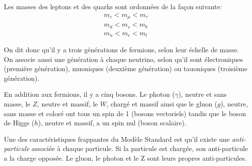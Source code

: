 Les masses des
leptons et des quarks sont ordonnées de la façon suivante:
\begin{eqnarray}
  m_e < m_\mu < m_\tau \nonumber \\
  m_d < m_s < m_b \\
  m_u < m_c < m_t \nonumber 
\end{eqnarray}

On dit donc qu'il y a trois générations de fermions, selon leur
échelle de masse. On associe aussi une génération à chaque neutrino,
selon qu'il sont électroniques (première génération), muoniques
(deuxième génération) ou tauoniques (troisième génération).


En addition aux fermions, il y a cinq bosons. Le photon ($\gamma$),
neutre et sans masse, le $Z$, neutre et massif, le $W$, chargé et
massif ainsi que le gluon ($g$), neutre, sans masse et coloré ont tous
un spin de 1 (bosons vectoriels) tandis que le boson de Higgs ($h$),
neutre et massif, a un spin nul (boson scalaire).

Une des caractéristiques frappantes du Modèle Standard est qu'il existe
une \emph{anti-particule} associée à chaque particule. Si la particule
est chargée, son anti-particule a la charge opposée. Le gluon, le
photon et le Z sont leurs propres anti-particules.

